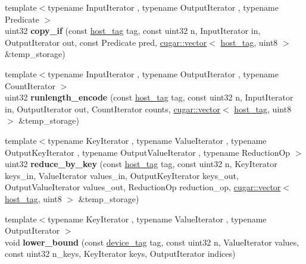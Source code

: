 \begin{DoxyCompactItemize}
\mbox{\label{namespacecugar_add305a782c6cbcd97b72443c277d2222}} 
{\footnotesize template$<$typename Input\+Iterator , typename Output\+Iterator , typename Predicate $>$ }\\uint32 {\bfseries copy\+\_\+if} (const \hyperlink{structcugar_1_1host__tag}{host\+\_\+tag} tag, const uint32 n, Input\+Iterator in, Output\+Iterator out, const Predicate pred, \hyperlink{structcugar_1_1vector}{cugar\+::vector}$<$ \hyperlink{structcugar_1_1host__tag}{host\+\_\+tag}, uint8 $>$ \&temp\+\_\+storage)
\item 
\mbox{\label{namespacecugar_a6a8e5633a701eb27a8a503f777a51b9e}} 
{\footnotesize template$<$typename Input\+Iterator , typename Output\+Iterator , typename Count\+Iterator $>$ }\\uint32 {\bfseries runlength\+\_\+encode} (const \hyperlink{structcugar_1_1host__tag}{host\+\_\+tag} tag, const uint32 n, Input\+Iterator in, Output\+Iterator out, Count\+Iterator counts, \hyperlink{structcugar_1_1vector}{cugar\+::vector}$<$ \hyperlink{structcugar_1_1host__tag}{host\+\_\+tag}, uint8 $>$ \&temp\+\_\+storage)
\item 
\mbox{\label{namespacecugar_a151415cb12b9a598ba44b0a28446d9bb}} 
{\footnotesize template$<$typename Key\+Iterator , typename Value\+Iterator , typename Output\+Key\+Iterator , typename Output\+Value\+Iterator , typename Reduction\+Op $>$ }\\uint32 {\bfseries reduce\+\_\+by\+\_\+key} (const \hyperlink{structcugar_1_1host__tag}{host\+\_\+tag} tag, const uint32 n, Key\+Iterator keys\+\_\+in, Value\+Iterator values\+\_\+in, Output\+Key\+Iterator keys\+\_\+out, Output\+Value\+Iterator values\+\_\+out, Reduction\+Op reduction\+\_\+op, \hyperlink{structcugar_1_1vector}{cugar\+::vector}$<$ \hyperlink{structcugar_1_1host__tag}{host\+\_\+tag}, uint8 $>$ \&temp\+\_\+storage)
\item 
\mbox{\label{namespacecugar_af0326f84b5e5221fa157312ae7ed58da}} 
{\footnotesize template$<$typename Key\+Iterator , typename Value\+Iterator , typename Output\+Iterator $>$ }\\void {\bfseries lower\+\_\+bound} (const \hyperlink{structcugar_1_1device__tag}{device\+\_\+tag} tag, const uint32 n, Value\+Iterator values, const uint32 n\+\_\+keys, Key\+Iterator keys, Output\+Iterator indices)

\end{DoxyCompactItemize}
